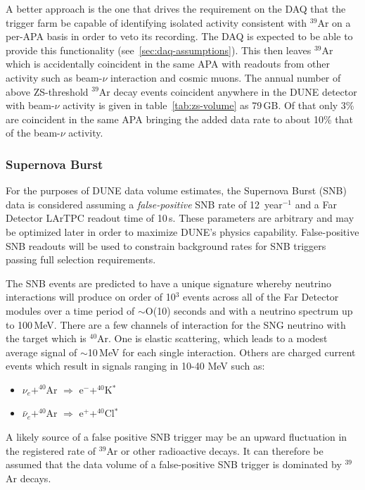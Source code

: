 A better approach is the one that drives the requirement on the DAQ
that the trigger farm be capable of identifying isolated activity
consistent with $^{39}$Ar on a per-APA basis in order to veto its
recording. The DAQ is expected to be able to provide this functionality
(see~\ref{sec:daq-assumptions}).
This then leaves $^{39}$Ar which is accidentally coincident in the
same APA with readouts from other activity such as beam-$\nu$
interaction and cosmic muons.
The annual number of above ZS-threshold $^{39}$Ar decay events
coincident anywhere in the DUNE detector with beam-$\nu$ activity is
given in table~\ref{tab:zs-volume} as 79\,GB. Of that only 3\% are coincident
in the same APA bringing the added data rate to about 10\% that of the beam-$\nu$ activity.

\subsubsection{Supernova Burst}
\label{sec:snb-data}
For the purposes of DUNE data volume estimates, the Supernova Burst (SNB)
data is considered assuming a
\textit{false-positive} SNB rate of 12~year$^{-1}$ and a Far Detector LArTPC
readout time of 10\,s.  These parameters are arbitrary and may be optimized later in order
to maximize DUNE's physics capability.  False-positive SNB readouts will be used to constrain
background rates for SNB triggers passing full selection requirements.

The SNB events are predicted to have a unique signature whereby
neutrino interactions will produce on order of 10$^3$ events across
all of the Far Detector modules over a time period of $\sim$O(10) seconds and with a
neutrino spectrum up to 100\,MeV. There are a few channels of interaction
for the SNG neutrino with the target which is $^{40}$Ar. One is elastic
scattering, which  leads to a modest average signal of $\sim$10\,MeV for
each single interaction. Others are charged current events which result in signals
ranging in 10-40 MeV such as:
\begin{itemize}

\item $\nu_e+^{40}$Ar $\Rightarrow$ e$^-$+$^{40}$K$^*$

\item $\bar{\nu}_e+^{40}$Ar $\Rightarrow$ e$^+$+$^{40}$Cl$^*$

\end{itemize}

A likely source of a false positive SNB trigger may be an upward
fluctuation in the registered rate of $^{39}$Ar or other radioactive decays.
It can therefore be assumed that the data volume of a
false-positive SNB trigger is dominated by $^{39}$Ar decays.

